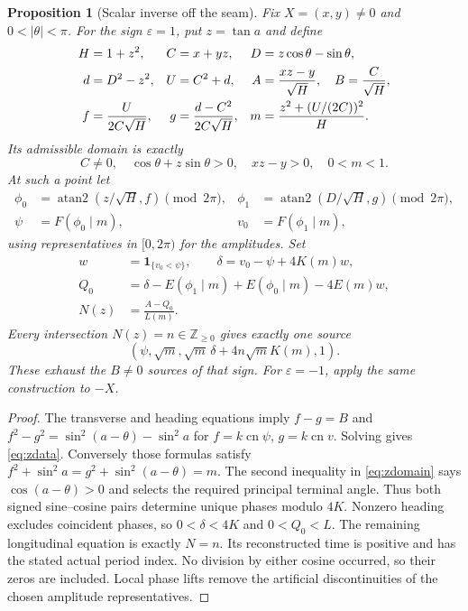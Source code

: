 \documentclass[11pt,a4paper]{article}
\newtheorem{proposition}[theorem]{Proposition}
\theoremstyle{remark}\newtheorem{remark}[theorem]{Remark}
\newcommand{\cn}{\operatorname{cn}}
\newcommand{\atan}{\operatorname{atan2}}
\newcommand{\ind}{\mathbf{1}}
\begin{document}
\begin{proposition}[Scalar inverse off the seam]\label{prop:inverse}
Fix $X=(x,y)\ne0$ and $0<|\theta|<\pi$. For the sign $\varepsilon=1$,
put $z=\tan a$ and define
\begin{align}
 H&=1+z^2,& C&=x+yz,& D&=z\cos\theta-\sin\theta,\notag\\
 d&=D^2-z^2,& U&=C^2+d,&
 A&=\frac{xz-y}{\sqrt H},\quad B=\frac C{\sqrt H},\label{eq:zdata}\\
 f&=\frac U{2C\sqrt H},&
 g&=\frac{d-C^2}{2C\sqrt H},&
 m&=\frac{z^2+(U/(2C))^2}{H}.\notag
\end{align}
Its admissible domain is exactly
\begin{equation}\label{eq:zdomain}
 C\ne0,\quad \cos\theta+z\sin\theta>0,\quad xz-y>0,\quad 0<m<1.
\end{equation}
At such a point let
\begin{align*}
 \phi_0&=\atan(z/\sqrt H,f)\pmod{2\pi},&
 \phi_1&=\atan(D/\sqrt H,g)\pmod{2\pi},\\
 \psi&=F(\phi_0\mid m),&v_0&=F(\phi_1\mid m),
\end{align*}
using representatives in $[0,2\pi)$ for the amplitudes. Set
\begin{equation}\label{eq:residual}
 \begin{split}
 w&=\ind_{\{v_0<\psi\}},\qquad \delta=v_0-\psi+4K(m)w,\\
 Q_0&=\delta-E(\phi_1\mid m)+E(\phi_0\mid m)-4E(m)w,\\
 N(z)&=\frac{A-Q_0}{L(m)}.
 \end{split}
\end{equation}
Every intersection $N(z)=n\in\mathbb Z_{\ge0}$ gives exactly one source
\[
 (\psi,\sqrt m,\sqrt m\,\delta+4n\sqrt m K(m),1).
\]
These exhaust the $B\ne0$ sources of that sign. For $\varepsilon=-1$,
apply the same construction to $-X$.
\end{proposition}

\begin{proof}
The transverse and heading equations imply
$f-g=B$ and $f^2-g^2=\sin^2(a-\theta)-\sin^2a$ for
$f=k\cn\psi$, $g=k\cn v$. Solving gives \eqref{eq:zdata}.
Conversely those formulas satisfy
$f^2+\sin^2a=g^2+\sin^2(a-\theta)=m$.
The second inequality in \eqref{eq:zdomain} says
$\cos(a-\theta)>0$ and selects the required principal terminal angle.
Thus both signed sine--cosine pairs determine unique phases modulo $4K$.
Nonzero heading excludes coincident phases, so $0<\delta<4K$ and
$0<Q_0<L$. The remaining longitudinal equation is exactly $N=n$.
Its reconstructed time is positive and has the stated actual period
index. No division by either cosine occurred, so their zeros are included.
Local phase lifts remove the artificial discontinuities of the chosen
amplitude representatives.
\end{proof}
\end{document}
